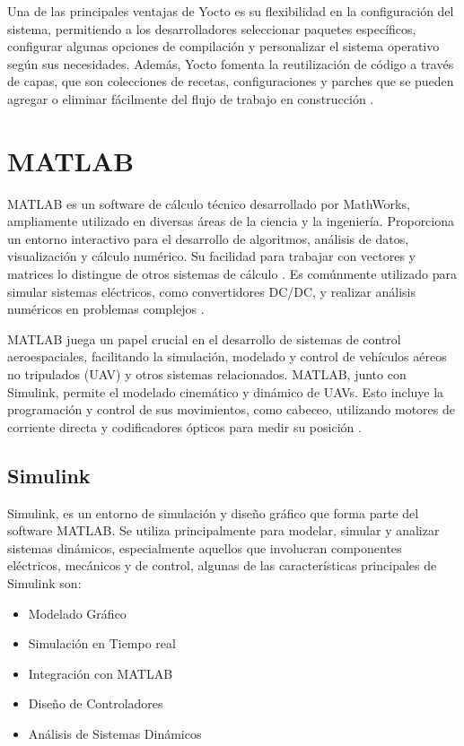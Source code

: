 Una de las principales ventajas de Yocto es su flexibilidad en la configuración del sistema, permitiendo a los desarrolladores seleccionar paquetes específicos, configurar algunas opciones de compilación y personalizar el sistema operativo según sus necesidades. Además, Yocto fomenta la reutilización de código a través de capas, que son colecciones de recetas, configuraciones y parches que se pueden agregar o eliminar fácilmente del flujo de trabajo en construcción \cite{Leppakoski2013FrameworkFI}.

\section{MATLAB}
MATLAB es un software de cálculo técnico desarrollado por MathWorks, ampliamente utilizado en diversas áreas de la ciencia y la ingeniería. Proporciona un entorno interactivo para el desarrollo de algoritmos, análisis de datos, visualización y cálculo numérico. Su facilidad para trabajar con vectores y matrices lo distingue de otros sistemas de cálculo \cite{PealozaLuna2022SimulacinDU}. Es comúnmente utilizado para simular sistemas eléctricos, como convertidores DC/DC, y realizar análisis numéricos en problemas complejos \cite{OrdezGarca2022MatlabCU}. 

MATLAB juega un papel crucial en el desarrollo de sistemas de control aeroespaciales, facilitando la simulación, modelado y control de vehículos aéreos no tripulados (UAV) y otros sistemas relacionados. MATLAB, junto con Simulink, permite el modelado cinemático y dinámico de UAVs. Esto incluye la programación y control de sus movimientos, como cabeceo, utilizando motores de corriente directa y codificadores ópticos para medir su posición \cite{Senz2020LaboratorioPE} \cite{ChvezGudio2023DesarrolloYC}.

\subsection{Simulink}

Simulink, es un entorno de simulación y diseño gráfico que forma parte del software MATLAB. Se utiliza principalmente para modelar, simular y analizar sistemas dinámicos, especialmente aquellos que involucran componentes eléctricos, mecánicos y de control, algunas  de las características principales de Simulink son:

\begin{itemize}
    \item Modelado Gráfico
    \item Simulación en Tiempo real
    \item Integración con MATLAB
    \item Diseño de Controladores
    \item Análisis de Sistemas Dinámicos
\end{itemize}

